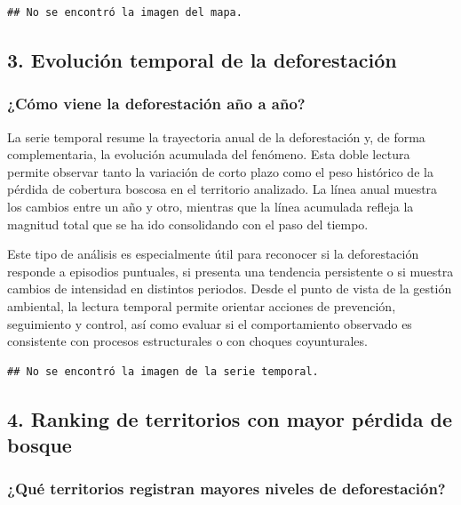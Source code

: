 \documentclass[
]{article}
\begin{document}
\begin{verbatim}
## No se encontró la imagen del mapa.
\end{verbatim}

\subsection{3. Evolución temporal de la
deforestación}\label{evoluciuxf3n-temporal-de-la-deforestaciuxf3n}

\subsubsection{¿Cómo viene la deforestación año a
año?}\label{cuxf3mo-viene-la-deforestaciuxf3n-auxf1o-a-auxf1o}

La serie temporal resume la trayectoria anual de la deforestación y, de
forma complementaria, la evolución acumulada del fenómeno. Esta doble
lectura permite observar tanto la variación de corto plazo como el peso
histórico de la pérdida de cobertura boscosa en el territorio analizado.
La línea anual muestra los cambios entre un año y otro, mientras que la
línea acumulada refleja la magnitud total que se ha ido consolidando con
el paso del tiempo.

Este tipo de análisis es especialmente útil para reconocer si la
deforestación responde a episodios puntuales, si presenta una tendencia
persistente o si muestra cambios de intensidad en distintos periodos.
Desde el punto de vista de la gestión ambiental, la lectura temporal
permite orientar acciones de prevención, seguimiento y control, así como
evaluar si el comportamiento observado es consistente con procesos
estructurales o con choques coyunturales.

\begin{verbatim}
## No se encontró la imagen de la serie temporal.
\end{verbatim}

\subsection{4. Ranking de territorios con mayor pérdida de
bosque}\label{ranking-de-territorios-con-mayor-puxe9rdida-de-bosque}

\subsubsection{¿Qué territorios registran mayores niveles de
deforestación?}\label{quuxe9-territorios-registran-mayores-niveles-de-deforestaciuxf3n}
\end{document}
